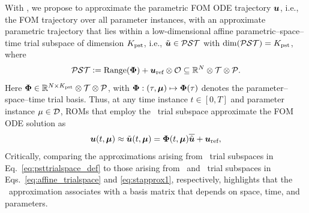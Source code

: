\documentclass[3p,computermodern,10pt]{elsarticle}
\begin{document}
With \parametricSpaceTimeAcronym, we propose to approximate the parametric FOM ODE trajectory $\boldsymbol u$, i.e., the FOM trajectory over all parameter instances, with an approximate parametric trajectory that lies within a low-dimensional affine parametric--space--time trial subspace of dimension $K_{\text{pst}}$, i.e., $\tilde{\boldsymbol u} \in \mathcal{PST}$ with $\dim(\mathcal{PST}) = K_{\text{pst}}$, where
\begin{equation}\label{eq:psttrialspace_def}
 \mathcal{PST} \vcentcolon= 
        \text{Range}(\boldsymbol \Phi) + 
        \boldsymbol u_{\text{ref}} \otimes \mathcal{O}
        \subseteq \mathbb{R}^{N} \otimes \mathcal{T} \otimes \mathcal{P}.
\end{equation}
Here $\boldsymbol \Phi \in \mathbb{R}^{N \times K_{\text{pst}}} \otimes \mathcal{T} \otimes \mathcal{P}$, with $\boldsymbol \Phi:(\tau,\boldsymbol \mu) \mapsto\boldsymbol \Phi(\tau)$ denotes the parameter--space--time trial basis. 
Thus, at any time instance $t\in[0,T]$ and parameter instance $\mu \in \mathcal{D}$, ROMs that employ the
\parametricSpaceTimeAcronym\ trial subspace approximate the FOM ODE solution as
\begin{equation}\label{eq:pstapprox1}
 \boldsymbol u(t,\boldsymbol \mu) \approx \tilde{\boldsymbol u}(t,\boldsymbol \mu) = \boldsymbol \Phi(t,\boldsymbol \mu) \overline{\hat{\boldsymbol u}} + \boldsymbol u_{\text{ref}},
\end{equation}
Critically, comparing the approximations arising from \parametricSpaceTimeAcronym\ trial subspaces in Eq.~\eqref{eq:psttrialspace_def} to those arising from \spatialAcronym\ and
\spaceTimeAcronym\ trial subspaces in Eqs.~\eqref{eq:affine_trialspace} and \eqref{eq:stapprox1}, respectively,
highlights that the \parametricSpaceTimeAcronym\ approximation associates with a basis matrix that depends on space, time, and parameters. 
\end{document}

